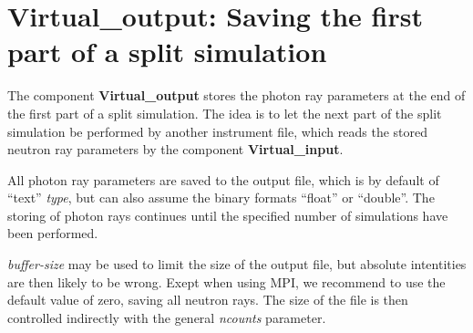 \section{Virtual\_output: Saving the first part of a split simulation}
\label{s:virtual-output}

The component \textbf{Virtual\_output} stores the photon ray parameters
at the end of the first part of a split simulation. The idea is to let the
next part of the split simulation be performed by another instrument file,
which reads the stored neutron ray
parameters by the component \textbf{Virtual\_input}.

All photon ray parameters are saved to the output file, which is by default
of ``text'' \textit{type}, but can also assume the binary formats
``float'' or ``double''. The storing of photon rays continues until the
specified number of simulations have been performed.

\textit{buffer-size} may be used to limit the size of the output file, but
absolute intentities are then likely to be wrong.
Exept when using MPI, we recommend to use the default value of zero, saving all neutron rays.
The size of the file is then controlled indirectly with the general \textit{ncounts} parameter.
